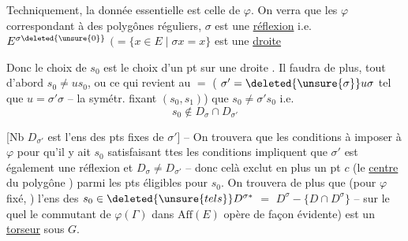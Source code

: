 
Techniquement, la donnée essentielle est celle de $\varphi$. On verra que   les $\varphi$  correspondant à des polygônes réguliers, \deleted{\unsure{\(\Rightarrow\)}} $\sigma$ est une \uline{réflexion} i.e. $E^{\sigma\deleted{\unsure{0}}}$ $(=\{x\in E\mid \sigma x=x\}$ est une \uline{droite}

Donc le choix  de $s_0$ est le choix d'un pt sur une droite . Il faudra de plus, tout d'abord $s_0\ne us_0$,  ou ce qui revient au $=$ (  $\sigma'=\deleted{\unsure{\sigma}}u\sigma$ tel que $u=\sigma'\sigma$ -- la symétr.  fixant $(s_0,s_1)$) que $s_0\ne\sigma's_0$ i.e.
\[
s_0\notin D_\sigma\cap D_{\sigma'}
\]


[Nb  $D_{\sigma'}$ est l'ens des pts fixes de $\sigma'$] -- On trouvera que les conditions à imposer à $\varphi$ pour qu'il y ait $s_0$ satisfaisant ttes les conditions impliquent que  $\sigma'$ est également une réflexion et $D_\sigma\ne D_{\sigma'}$ -- donc  celà exclut  en plus un pt $c$ (le \uline{centre} du polygône ) parmi les pts éligibles pour $s_0$. On trouvera de plus que (pour $\varphi$ fixé,  ) l'ens des $s_0\in\deleted{\unsure{tels}}D^{\sigma *}$ $=$  $D^\sigma-\{D\cap D^\sigma\}$  -- sur le quel le commutant  de $\varphi(\Gamma)$ dans $\mathrm{Aff}(E)$ opère de façon évidente) est un \uline{torseur} sous $G$.

